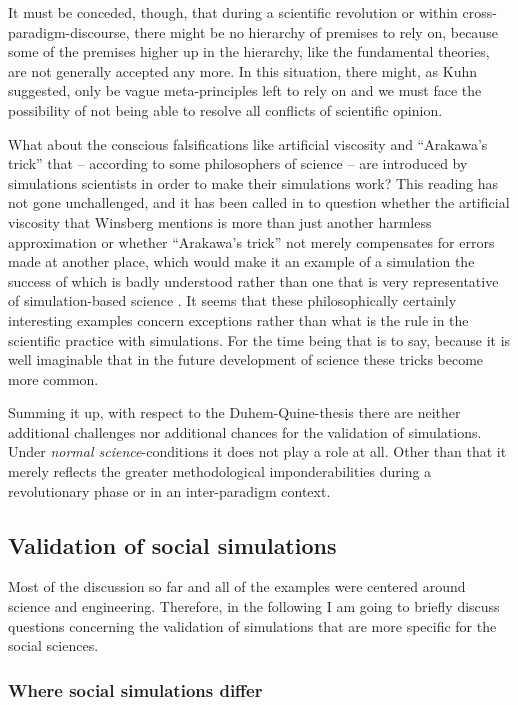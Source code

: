 \documentclass[12pt, a4paper]{article}
\begin{document}
It must be conceded, though, that during a scientific revolution or
within cross-paradigm-discourse, there might be no hierarchy of
premises to rely on, because some of the premises higher up in the
hierarchy, like the fundamental theories, are not generally accepted
any more. In this situation, there might, as Kuhn suggested, only be
vague meta-principles left to rely on and we must face the possibility
of not being able to resolve all conflicts of scientific opinion.

What about the conscious falsifications like artificial viscosity and
``Arakawa's trick'' that -- according to some philosophers of science
-- are introduced by simulations scientists in order to make their
simulations work? This reading has not gone unchallenged, and it has
been called in to question whether the artificial viscosity that
Winsberg mentions is more than just another harmless approximation
\citep{peschard:2011b} or whether ``Arakawa's trick'' not merely
compensates for errors made at another place, which would make it an
example of a simulation the success of which is badly understood
rather than one that is very representative of simulation-based
science \citep[333f.]{beisbart:2011}. It seems that these
philosophically certainly interesting examples concern exceptions
rather than what is the rule in the scientific practice with
simulations. For the time being that is to say, because it is well
imaginable that in the future development of science these tricks
become more common.

Summing it up, with respect to the Duhem-Quine-thesis there are
neither additional challenges nor additional chances for the
validation of simulations. Under {\em normal science}-conditions it
does not play a role at all. Other than that it merely reflects the
greater methodological imponderabilities during a revolutionary phase
or in an inter-paradigm context.

\subsection{Validation of social simulations}

Most of the discussion so far and all of the examples were centered
around science and engineering. Therefore, in the following I am going
to briefly discuss questions concerning the validation of simulations
that are more specific for the social sciences.

\subsubsection{Where social simulations differ}
\end{document}
